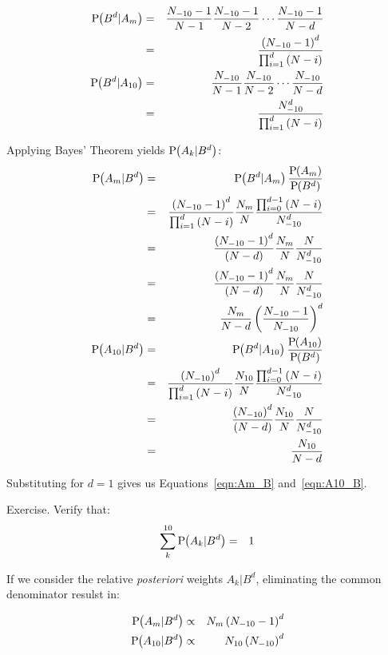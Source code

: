 \begin{eqnarray}
\textrm{P}\hspace{-.5ex}\left(B^d|A_m\right) &=& \frac{N_{-10}-1}{N-1}\frac{N_{-10}-1}{N-2}\cdots\frac{N_{-10}-1}{N-d} \nonumber \\
&=& \frac{\left(N_{-10}-1\right)^d}{\prod_{i=1}^{d}{\left(N-i\right)}}\\
\textrm{P}\hspace{-.5ex}\left(B^d|A_{10}\right) &=& \frac{N_{-10}}{N-1}\frac{N_{-10}}{N-2}\cdots\frac{N_{-10}}{N-d} \nonumber \\
&=& \frac{N_{-10}^d}{\prod_{i=1}^{d}{\left(N-i\right)}}
\end{eqnarray}

\noindent
Applying Bayes' Theorem yields $\textrm{P}\hspace{-.5ex}\left(A_k|B^d\right)$:
\begin{eqnarray}
\textrm{P}\hspace{-.5ex}\left(A_m|B^d\right) &=& \textrm{P}\hspace{-.5ex}\left(B^d|A_m\right)\frac{\textrm{P}\hspace{-.5ex}\left(A_m\right)}{\textrm{P}\hspace{-.5ex}\left(B^d\right)} \nonumber \\
&=& \frac{\left(N_{-10}-1\right)^d}{\prod_{i=1}^{d}{\left(N-i\right)}}
\frac{N_m}{N} \frac{\prod_{i=0}^{d-1}{\left(N-i\right)}}{N_{-10}^d} \nonumber \\
&=& \frac{\left(N_{-10}-1\right)^d}{\left(N-d\right)}
\frac{N_m}{N} \frac{N}{N_{-10}^d} \nonumber \\
&=& \frac{\left(N_{-10}-1\right)^d}{\left(N-d\right)}
\frac{N_m}{N} \frac{N}{N_{-10}^d} \nonumber \\
&=& \frac{N_m}{N-d} \left(\frac{N_{-10}-1}{N_{-10}}\right)^d \label{eqn:Am_Bd} \\
\textrm{P}\hspace{-.5ex}\left(A_{10}|B^d\right) &=& \textrm{P}\hspace{-.5ex}\left(B^d|A_{10}\right)\frac{\textrm{P}\hspace{-.5ex}\left(A_{10}\right)}{\textrm{P}\hspace{-.5ex}\left(B^d\right)} \nonumber \\
&=& \frac{\left(N_{-10}\right)^d}{\prod_{i=1}^{d}{\left(N-i\right)}}
\frac{N_{10}}{N} \frac{\prod_{i=0}^{d-1}{\left(N-i\right)}}{N_{-10}^d} \nonumber \\
&=& \frac{\left(N_{-10}\right)^d}{\left(N-d\right)}
\frac{N_{10}}{N} \frac{N}{N_{-10}^d} \nonumber \\
&=& \frac{N_{10}}{N-d} \label{eqn:A10_Bd}
\end{eqnarray}

\noindent
Substituting for $d=1$ gives us Equations~\ref{eqn:Am_B} and~\ref{eqn:A10_B}.

Exercise.
Verify that:
\begin{eqnarray}
\sum_{k}^{10}{\textrm{P}\hspace{-.5ex}\left(A_k|B^d\right)} &=& 1
\end{eqnarray}

If we consider the relative \emph{posteriori} weights $A_k|B^d$, 
eliminating the common denominator resulst in:

\begin{eqnarray}
\textrm{P}\hspace{-.5ex}\left(A_m|B^d\right) &\propto& N_m \left(N_{-10}-1\right)^d \\
\textrm{P}\hspace{-.5ex}\left(A_{10}|B^d\right) &\propto& N_{10} \left(N_{-10}\right)^d
\end{eqnarray}

